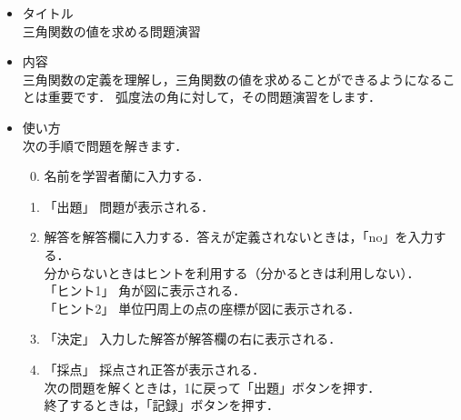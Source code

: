 \documentclass[20]{jarticle}
\begin{document}
\begin{itemize}
\item タイトル\\
三角関数の値を求める問題演習
\item 内容\\
三角関数の定義を理解し，三角関数の値を求めることができるようになることは重要です．
弧度法の角に対して，その問題演習をします．

\item 使い方\\
次の手順で問題を解きます．
\begin{enumerate}
\setcounter{enumi}{-1}
\item 名前を学習者蘭に入力する．
\item 「出題」 問題が表示される．
\item 解答を解答欄に入力する．答えが定義されないときは，「no」を入力する．\\[1mm]
分からないときはヒントを利用する（分かるときは利用しない）．\\[1mm]
\hspace{1zw}「ヒント1」 角が図に表示される．\\[1mm]
\hspace{1zw}「ヒント2」 単位円周上の点の座標が図に表示される．
\item 「決定」 入力した解答が解答欄の右に表示される．
\item 「採点」 採点され正答が表示される．\\[1mm]
\hspace{2zw}次の問題を解くときは，1に戻って「出題」ボタンを押す．\\[1mm]
\hspace{2zw}終了するときは，「記録」ボタンを押す．


\end{enumerate}

\end{itemize}
\end{document}

